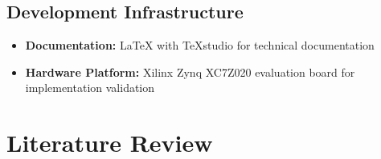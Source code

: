 \subsection{Development Infrastructure}
\begin{itemize}
\item \textbf{Documentation:} LaTeX with TeXstudio for technical documentation
\item \textbf{Hardware Platform:} Xilinx Zynq XC7Z020 evaluation board for implementation validation
\end{itemize}

\section{Literature Review}
\label{sec:literature_review}

